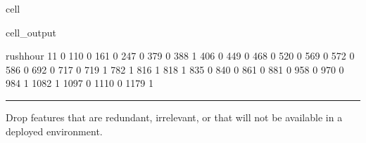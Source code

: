 \documentclass[letterpaper,10pt,english]{sphinxmanual}
\begin{document}
\begin{sphinxuseclass}{cell}
\begin{sphinxuseclass}{cell_output}
\begin{sphinxVerbatim}[commandchars=\\\{\}]
      rush\PYGZus{}hour  
11            0  
110           0  
161           0  
247           0  
379           0  
388           1  
406           0  
449           0  
468           0  
520           0  
569           0  
572           0  
586           0  
692           0  
717           0  
719           1  
782           1  
816           1  
818           1  
835           0  
840           0  
861           0  
881           0  
958           0  
970           0  
984           1  
1082          1  
1097          0  
1110          0  
1179          1  
\end{sphinxVerbatim}

\end{sphinxuseclass}
\end{sphinxuseclass}

\bigskip\hrule\bigskip


\sphinxAtStartPar
{}

\sphinxAtStartPar
Drop features that are redundant, irrelevant, or that will not be available in a deployed environment.
\end{document}
